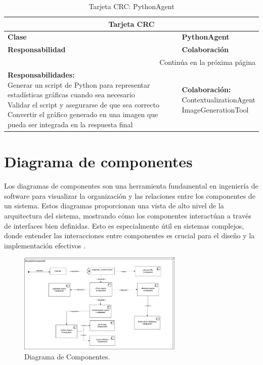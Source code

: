 \begin{longtable}{|l|l|}
	\caption{Tarjeta CRC: PythonAgent} \label{tablacrc5} \\
	
	\hline
	\multicolumn{2}{|c|}{\textbf{Tarjeta CRC}} \\
	\hline
	\textbf{Clase} & \textbf{PythonAgent} \\
	\hline
	\endfirsthead
	
	\hline
	\textbf{Responsabilidad} & \textbf{Colaboración} \\
	\hline
	\endhead
	
	\hline
	\multicolumn{2}{|r|}{Continúa en la próxima página} \\
	\hline
	\endfoot
	
	\hline
	\endlastfoot
	
	\parbox[t]{0.45\linewidth}{\textbf{Responsabilidades:} \\ 
		Generar un script de Python para representar estadísticas gráficas cuando sea necesario \\ 
		Validar el script y asegurarse de que sea correcto \\ 
		Convertir el gráfico generado en una imagen que pueda ser integrada en la respuesta final} 
	& 
	\parbox[t]{0.45\linewidth}{\textbf{Colaboración:} \\
		ContextualizationAgent \\ 
		ImageGenerationTool}
\end{longtable}






\section{Diagrama de componentes}

Los diagramas de componentes son una herramienta fundamental en ingeniería de software para visualizar la organización y las relaciones entre los componentes de un sistema. Estos diagramas proporcionan una vista de alto nivel de la arquitectura del sistema, mostrando cómo los componentes interactúan a través de interfaces bien definidas. Esto es especialmente útil en sistemas complejos, donde entender las interacciones entre componentes es crucial para el diseño y la implementación efectivos \cite{Restackio2025}.

\begin{figure}[h]
	\centering
	\includegraphics[width=0.7\textwidth]{images/component.png}
	\caption{Diagrama de Componentes.}
	\label{fig:Diagrama de Componente.}
\end{figure}

